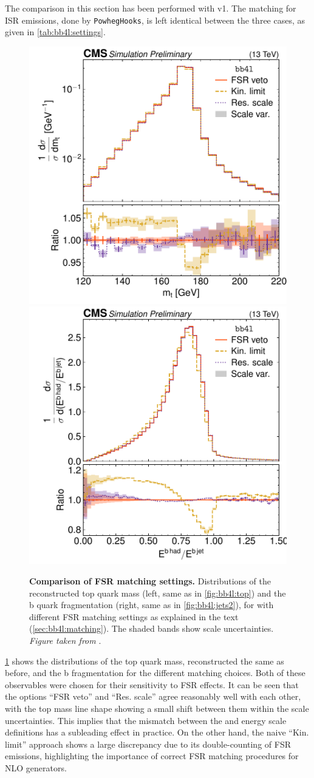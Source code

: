 The comparison in this section has been performed with \bbfourl v1. The matching for ISR emissions, done by \texttt{PowhegHooks}, is left identical between the three cases, as given in \cref{tab:bb4l:settings}.

\begin{figure}[tp]
    \centering
    \includegraphics[width=0.49 \textwidth]{figures/bb4l/matching/ADDED_top_mass.pdf}
    \hfill
    \includegraphics[width=0.49 \textwidth]{figures/bb4l/matching/MC_HFJETS_efracB.pdf}
    \caption{\textbf{Comparison of FSR matching settings.} Distributions of the reconstructed top quark mass (left, same as in \cref{fig:bb4l:top}) and the b quark fragmentation (right, same as in \cref{fig:bb4l:jets2}), for \bbfourl with different FSR matching settings as explained in the text (\cref{sec:bb4l:matching}). The shaded bands show scale uncertainties. \textit{Figure taken from }.}
    \label{fig:bb4l:matching}
\end{figure}

\cref{fig:bb4l:matching} shows the distributions of the top quark mass, reconstructed the same as before, and the b fragmentation for the different matching choices. Both of these observables were chosen for their sensitivity to FSR effects. It can be seen that the options ``FSR veto'' and ``Res. scale'' agree reasonably well with each other, with the top mass line shape showing a small shift between them within the scale uncertainties. This implies that the mismatch between the \powheg and \pythia energy scale definitions has a subleading effect in practice. On the other hand, the naive ``Kin. limit'' approach shows a large discrepancy due to its double-counting of FSR emissions, highlighting the importance of correct FSR matching procedures for NLO generators.

